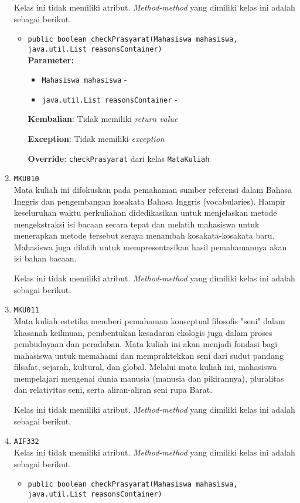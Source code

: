 \documentclass{article}
\begin{document}
\begin{enumerate}
Kelas ini tidak memiliki atribut. \textit{Method-method} yang dimiliki kelas ini adalah sebagai berikut.
\begin{itemize}
\item \texttt{public boolean checkPrasyarat(Mahasiswa mahasiswa, java.util.List reasonsContainer)}\\ 


\textbf{Parameter:}\begin{itemize}
\item \texttt{Mahasiswa mahasiswa} - 
\item \texttt{java.util.List reasonsContainer} - 
\end{itemize}
\textbf{Kembalian}: Tidak memiliki \textit{return value}

\textbf{Exception}: Tidak memiliki \textit{exception}

\textbf{Override}: \texttt{checkPrasyarat} dari kelas \texttt{MataKuliah}

\end{itemize}
\item \texttt{MKU010}\\ 
Mata kuliah ini difokuskan pada pemahaman sumber referensi dalam Bahasa Inggris dan 
 pengembangan kosakata Bahasa Inggris (vocabularies). Hampir keseluruhan waktu perkuliahan 
 didedikasikan untuk menjelaskan metode mengekstraksi isi bacaan secara tepat dan melatih 
 mahasiswa untuk menerapkan metode tersebut seraya menambah kosakata-kosakata baru. 
 Mahasiswa juga dilatih untuk mempresentasikan hasil pemahamannya akan isi bahan bacaan.

Kelas ini tidak memiliki atribut. \textit{Method-method} yang dimiliki kelas ini adalah sebagai berikut.
\begin{itemize}
\end{itemize}
\item \texttt{MKU011}\\ 
Mata kuliah estetika memberi pemahaman konseptual filosofis "seni" dalam khasanah keilmuan, 
 pembentukan kesadaran ekologis juga dalam proses pembudayaan dan peradaban. Mata kuliah ini 
 akan menjadi fondasi bagi mahasiswa untuk memahami dan mempraktekkan seni dari sudut pandang
 filsafat, sejarah, kultural, dan global. Melalui mata kuliah ini, mahasiswa mempelajari
 mengenai dunia manusia (manusia dan pikirannya), pluralitas dan relativitas seni, serta 
 aliran-aliran seni rupa Barat.

Kelas ini tidak memiliki atribut. \textit{Method-method} yang dimiliki kelas ini adalah sebagai berikut.
\begin{itemize}
\end{itemize}
\item \texttt{AIF332}\\ 
Kelas ini tidak memiliki atribut. \textit{Method-method} yang dimiliki kelas ini adalah sebagai berikut.
\begin{itemize}
\item \texttt{public boolean checkPrasyarat(Mahasiswa mahasiswa, java.util.List reasonsContainer)}\\ 



\end{itemize}
\end{enumerate}
\end{document}
